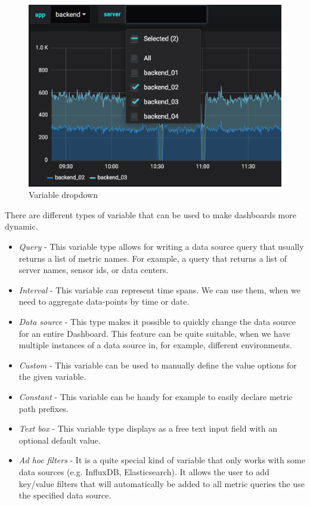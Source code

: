 \begin{figure}[H]
	\centering
	\includegraphics[width=130mm, keepaspectratio]{figures/variable-dropdown.png}
	\caption{Variable dropdown \cite{grafana-variables-dashboard-image}}
	\label{fig:variable-dropdown}
\end{figure}


There are different types of variable that can be used to make dashboards more dynamic. \cite{grafana-variables-types}
\begin{itemize}
	\item \emph{Query} - This variable type allows for writing a data source query that usually returns a list of metric names. For example, a query that returns a list of server names, sensor ids, or data centers.
	\item \emph{Interval} - This variable can represent time spans. We can use them, when we need to aggregate data-points by time or date.
	\item \emph{Data source} - This type makes it possible to quickly change the data source for an entire Dashboard. This feature can be quite suitable, when we have multiple instances of a data source in, for example, different environments.
	\item \emph{Custom} - This variable can be used to manually define the value options for the given variable.
	\item \emph{Constant} - This variable can be handy for example to easily declare metric path prefixes. 
	\item \emph{Text box} - This variable type displays as a free text input field with an optional default value.
	\item \emph{Ad hoc filters} - It is a quite special kind of variable that only works with some data sources (e.g. InfluxDB, Elasticsearch). It allows the user to add key/value filters that will automatically be added to all metric queries the use the specified data source.
\end{itemize}

